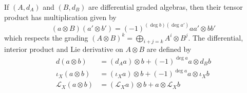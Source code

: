 \begin{comment} %
\begin{defn}
	A differential form $\alpha\in\Omega(P,V)$ on a principal $G$-bundle  with 
	representation $(V,\rho)$ is \underline{$\rho$-equivariant}   
	if for every $g\in G$, $r_g^*\alpha = \rho(g^{-1})\alpha$. 
	\\
	A differential form $\alpha\in\Omega(P,V)$ on a principal $G$-bundle  with 
	representation $(V,\rho)$ is \underline{basic}  
	if it is horizontal and $\rho$-equivariant. This subspace is
	denoted $\Omega_{bas}(P,V)$.
\end{defn}
Let $P$ be a principle $G$-bundle, and let ($V,\rho$) be a representation of
$G$. Let $E= P\times_\rho V$ be the associated bundle.
\begin{thm} %
	The map $\Omega_{bas}^k(P,V) \to \Omega^k(M,P\times_\rho V)$ given by 
	$\omega \mapsto \alpha_x = f_p \circ \omega_p$
	is a linear isomorphism, where $f_p: V\to E_x$ is the isomorphism  $v\mapsto
	[p,v]$, and $p\in\pi^{-1}(x)$ is any point.
\end{thm}

\begin{cor} %
	There is a natural isomorphism between $\Gamma(M,P\times_\rho V)$ and
	$\rho$-equivariant maps in
	$C^{\infty}(P,V)$, given by sending $s\in C^{\infty}(P,V)^G$ to $s_M$
	defined by  $s_M(x) = [p,s(p)]$, where  $p\in\pi^{-1}(x)$ is any element.
\end{cor}


Recall that a \underline{vertical vector} on a fibre bundle $E$ with base  $M$
is a tangent vector  $X\in TE$ such that  $X(\pi^* f) = 0$ for any  $f\in
C^\infty(M)$. The space $V_pP$ of vertical tangent vectors to a point $p$ in a
principal $G$-bundle can be canonically identified with the Lie algebra $\mathfrak{g}$ 
of $G$ in the following way. 
If $X\in\mathfrak{g}$, the \underline{fundamental vector field} associated to
$X$, denoted $X_P \in \Gamma(VP)$, is
 \[
X_P = \odv{}{t}_{t=0} p \exp (t X)
\] 
This is a vertical vector field because $X_P(\pi^*f) = \odv{}{t}_{t=0} f(p \exp
(t X)) = 0$. 
\end{comment}


If $(A,d_A)$ and  $(B,d_B)$ are differential graded algebras, then their tensor product has
multiplication given by 
\begin{equation} \label{eq:tensor_mult}
	 (a\otimes B)(a'\otimes b') = (-1)^{(\deg b)(\deg a')}aa'\otimes bb'
\end{equation}
which respects the grading $(A\otimes B)^k = \bigoplus_{i+j= k} A^i\otimes B^j$.
The differential, interior product and Lie derivative on $A\otimes B$ are defined by 
\begin{align}
	d(a\otimes b) &= (d_A a)\otimes b + (-1)^{\deg a}a\otimes d_Bb \nonumber \\
	\iota_X(a\otimes b) &= (\iota_X a)\otimes b +(-1)^{\deg a}a\otimes \iota_Xb
	\label{eq:tensor_ops} \\
	\mathcal{L}_X(a\otimes b) &= (\mathcal{L}_X a)\otimes b +a\otimes\mathcal{L}_Xb
	\nonumber
\end{align}
 
